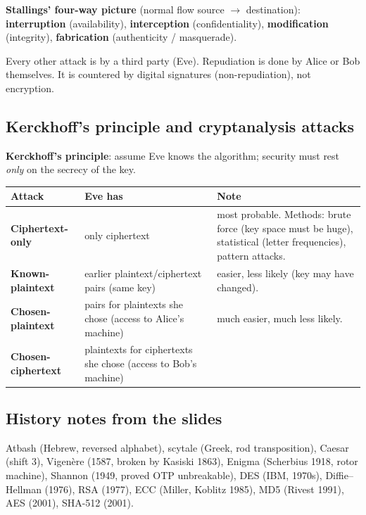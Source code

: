 \textbf{Stallings' four-way picture} (normal flow source $\to$ destination): \textbf{interruption} (availability), \textbf{interception} (confidentiality), \textbf{modification} (integrity), \textbf{fabrication} (authenticity / masquerade).

\begin{trap}
Every other attack is by a third party (Eve). Repudiation is done by Alice or Bob themselves. It is countered by digital signatures (non-repudiation), not encryption.
\end{trap}

\subsection{Kerckhoff's principle and cryptanalysis attacks}
\textbf{Kerckhoff's principle}: assume Eve knows the algorithm; security must rest \emph{only} on the secrecy of the key.
\begin{center}\small
\begin{tabularx}{\textwidth}{@{}l X X@{}}
\toprule
Attack & Eve has & Note\\
\midrule
\textbf{Ciphertext-only} & only ciphertext & most probable. Methods: brute force (key space must be huge), statistical (letter frequencies), pattern attacks.\\
\textbf{Known-plaintext} & earlier plaintext/ciphertext pairs (same key) & easier, less likely (key may have changed).\\
\textbf{Chosen-plaintext} & pairs for plaintexts she chose (access to Alice's machine) & much easier, much less likely.\\
\textbf{Chosen-ciphertext} & plaintexts for ciphertexts she chose (access to Bob's machine) & \\
\bottomrule
\end{tabularx}
\end{center}

\subsection{History notes from the slides}
Atbash (Hebrew, reversed alphabet), scytale (Greek, rod transposition), Caesar (shift 3), Vigen\`ere (1587, broken by Kasiski 1863), Enigma (Scherbius 1918, rotor machine), Shannon (1949, proved OTP unbreakable), DES (IBM, 1970s), Diffie--Hellman (1976), RSA (1977), ECC (Miller, Koblitz 1985), MD5 (Rivest 1991), AES (2001), SHA-512 (2001).


